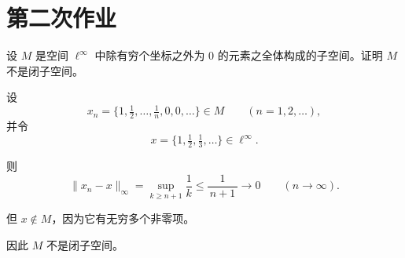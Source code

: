 \section{第二次作业}
\begin{homework}[3]
设 $M$ 是空间 $\ell^\infty$ 中除有穷个坐标之外为 $0$ 的元素之全体构成的子空间。证明 $M$ 不是闭子空间。
\end{homework}
\begin{solution}
设
\[
x_n=\{1,\tfrac12,\dots,\tfrac1n,0,0,\dots\}\in M \qquad (n=1,2,\dots),
\]
并令
\[
x=\{1,\tfrac12,\tfrac13,\dots\}\in \ell^\infty.
\]

则
\[
\|x_n-x\|_\infty=\sup_{k\ge n+1}\frac1k\le \frac1{\,n+1\,}\longrightarrow 0
\qquad (n\to\infty).
\]

但 $x\notin M$，因为它有无穷多个非零项。

因此 $M$ 不是闭子空间。
\end{solution}

